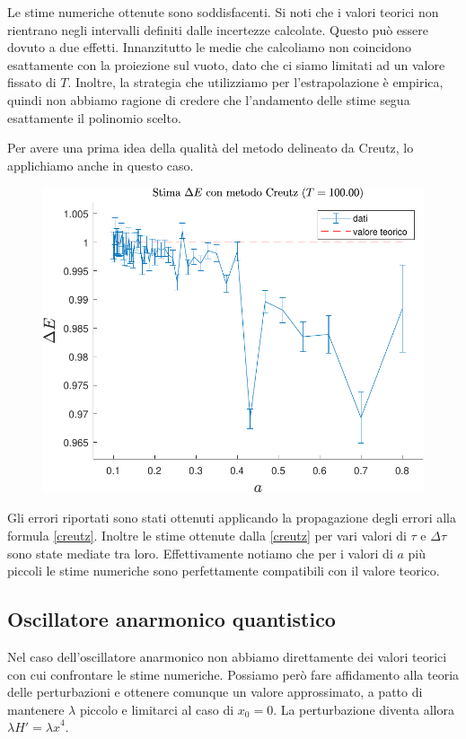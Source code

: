 \documentclass[11pt, a4paper]{article}
\begin{document}
Le stime numeriche ottenute sono soddisfacenti. Si noti che i valori teorici non rientrano negli intervalli definiti dalle incertezze calcolate.
Questo può essere dovuto a due effetti. Innanzitutto le medie che calcoliamo non coincidono esattamente con la proiezione sul vuoto, dato che ci siamo limitati ad un valore fissato di $T$.
Inoltre, la strategia che utilizziamo per l'estrapolazione è empirica, quindi non abbiamo ragione di credere che l'andamento delle stime segua esattamente il polinomio scelto.

Per avere una prima idea della qualità del metodo delineato da Creutz, lo applichiamo anche in questo caso.

\begin{figure}[H]
  \centering
  \includegraphics{../plots/qho/final/de_creutz_a0.80-0.10_T100-crop.pdf}
  \caption{}
\end{figure}

Gli errori riportati sono stati ottenuti applicando la propagazione degli errori alla formula \eqref{creutz}.
Inoltre le stime ottenute dalla \eqref{creutz} per vari valori di $\tau$ e $\Delta \tau$ sono state mediate tra loro.
Effettivamente notiamo che per i valori di $a$ più piccoli le stime numeriche sono perfettamente compatibili con il valore teorico.

\subsection{Oscillatore anarmonico quantistico}

Nel caso dell'oscillatore anarmonico non abbiamo direttamente dei valori teorici con cui confrontare le stime numeriche.
Possiamo però fare affidamento alla teoria delle perturbazioni e ottenere comunque un valore approssimato, a patto di mantenere $\lambda$ piccolo e limitarci al caso di $x_0 = 0$.
La perturbazione diventa allora $\lambda H' = \lambda \hat{x}^4$.
\end{document}
